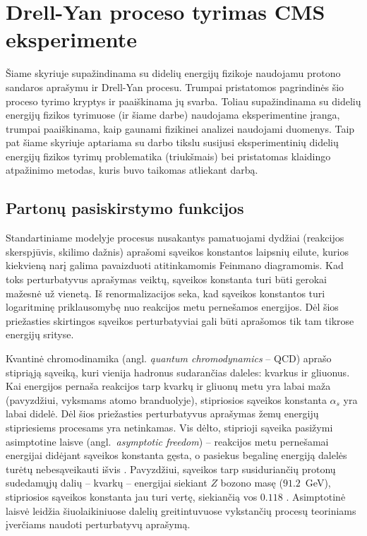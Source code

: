 \documentclass[a4paper, 12pt, oneside]{article}
\begin{document}
\section{Drell-Yan proceso tyrimas CMS eksperimente}
Šiame skyriuje supažindinama su didelių energijų fizikoje naudojamu protono sandaros aprašymu ir Drell-Yan procesu.
Trumpai pristatomos pagrindinės šio proceso tyrimo kryptys ir paaiškinama jų svarba.
Toliau supažindinama su didelių energijų fizikos tyrimuose (ir šiame darbe) naudojama eksperimentine įranga, trumpai paaiškinama,
kaip gaunami fizikinei analizei naudojami duomenys.
Taip pat šiame skyriuje aptariama su darbo tikslu susijusi eksperimentinių didelių energijų fizikos tyrimų problematika
(triukšmais) bei pristatomas klaidingo atpažinimo metodas, kuris buvo taikomas atliekant darbą.

\subsection{Partonų pasiskirstymo funkcijos}
Standartiniame modelyje procesus nusakantys pamatuojami dydžiai (reakcijos skerspjūvis, skilimo dažnis) aprašomi sąveikos
konstantos laipsnių eilute, kurios kiekvieną narį galima pavaizduoti atitinkamomis Feinmano diagramomis.
Kad toks perturbatyvus aprašymas veiktų, sąveikos konstanta turi būti gerokai mažesnė už vienetą.
Iš renormalizacijos seka, kad sąveikos konstantos turi logaritminę priklausomybę nuo reakcijos metu pernešamos energijos.
Dėl šios priežasties skirtingos sąveikos perturbatyviai gali būti aprašomos tik tam tikrose energijų srityse\cite{QCDalpha}.

Kvantinė chromodinamika (angl. \textit{ąuantum chromodynamics} -- QCD) aprašo stipriąją sąveiką, kuri vienija hadronus
sudarančias daleles: kvarkus ir gliuonus.
Kai energijos pernaša reakcijos tarp kvarkų ir gliuonų metu yra labai maža (pavyzdžiui, vyksmams atomo branduolyje),
stipriosios sąveikos konstanta $\alpha_s$ yra labai didelė.
Dėl šios priežasties perturbatyvus aprašymas žemų energijų stipriesiems procesams yra netinkamas.
Vis dėlto, stiprioji sąveika pasižymi asimptotine laisve (angl.\ \textit{asymptotic freedom}) -- reakcijos metu pernešamai
energijai didėjant sąveikos konstanta gęsta, o pasiekus begalinę energiją dalelės turėtų nebesąveikauti išvis \cite{AFreedom}.
Pavyzdžiui, sąveikos tarp susiduriančių protonų sudedamųjų dalių -- kvarkų -- energijai siekiant $Z$ bozono masę ($91.2$~GeV),
stipriosios sąveikos konstanta jau turi vertę, siekiančią vos $0.118$ \cite{PDGreview}.
Asimptotinė laisvė leidžia šiuolaikiniuose dalelių greitintuvuose vykstančių procesų teoriniams įverčiams naudoti
perturbatyvų aprašymą.
\end{document}
